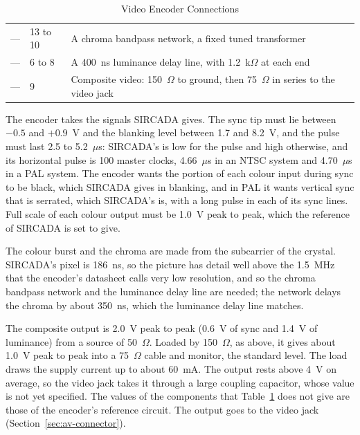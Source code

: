 \begin{table}[H]
\begin{tabular}{llp{6.6cm}}
		---               & 13 to 10            & A chroma bandpass network, a fixed tuned transformer                                                 \\
		---               & 6 to 8              & A 400~ns luminance delay line, with 1.2~k$\Omega$ at each end                                        \\
		---               & 9                   & Composite video: 150~$\Omega$ to ground, then 75~$\Omega$ in series to the video jack                \\
		\bottomrule
	\end{tabular}
	\caption{Video Encoder Connections}
	\label{tab:display-nets}
\end{table}

\noindent The encoder takes the signals SIRCADA gives. The sync tip must lie between $-0.5$ and $+0.9$~V and the blanking level
between 1.7 and 8.2~V, and the pulse must last 2.5 to 5.2~$\mu$s: SIRCADA's  is low for the pulse and high
otherwise, and its horizontal pulse is 100 master clocks, 4.66~$\mu$s in an NTSC system and 4.70~$\mu$s in a PAL system. The
encoder wants the portion of each colour input during sync to be black, which SIRCADA gives in blanking, and in PAL it wants
vertical sync that is serrated, which SIRCADA's is, with a long pulse in each of its sync lines. Full scale of each colour
output must be 1.0~V peak to peak, which the reference of SIRCADA is set to give.

The colour burst and the chroma are made from the subcarrier of the crystal. SIRCADA's pixel is 186~ns, so the picture
has detail well above the 1.5~MHz that the encoder's datasheet calls very low resolution, and so the chroma bandpass
network and the luminance delay line are needed; the network delays the chroma by about 350~ns, which the luminance
delay line matches.

The composite output is 2.0~V peak to peak (0.6~V of sync and 1.4~V of luminance) from a source of 50~$\Omega$. Loaded
by 150~$\Omega$, as above, it gives about 1.0~V peak to peak into a 75~$\Omega$ cable and monitor, the standard level.
The load draws the supply current up to about 60~mA. The output rests above 4~V on average, so the video jack takes it
through a large coupling capacitor, whose value is not yet specified. The values of the components that
Table~\ref{tab:display-nets} does not give are those of the encoder's reference circuit. The output goes to the video
jack (Section~\ref{sec:av-connector}).


